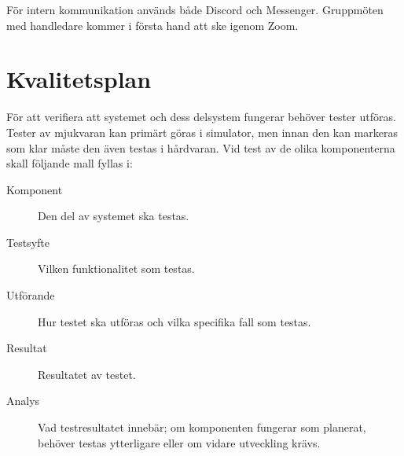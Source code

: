 \documentclass[a4paper]{article}
\begin{document}
För intern kommunikation används både Discord och Messenger. Gruppmöten med handledare kommer i första hand att ske igenom Zoom.

\section{Kvalitetsplan}

För att verifiera att systemet och dess delsystem fungerar behöver tester utföras. Tester av mjukvaran kan primärt göras i simulator, men innan den kan markeras som klar måste den även testas i hårdvaran. Vid test av de olika komponenterna skall följande mall fyllas i:

\begin{description}
\item[Komponent] Den del av systemet ska testas.

\item[Testsyfte] Vilken funktionalitet som testas.

\item[Utförande] Hur testet ska utföras och vilka specifika fall som testas.

\item[Resultat] Resultatet av testet.

\item[Analys] Vad testresultatet innebär; om komponenten fungerar som planerat, behöver testas ytterligare eller om vidare utveckling krävs.
\end{description}




\end{document}
